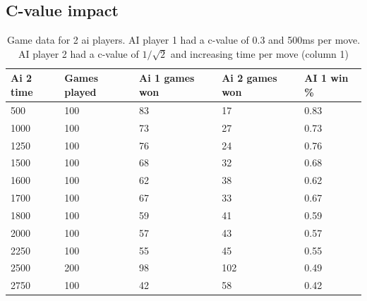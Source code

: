 \documentclass[
11pt, %
english, %
singlespacing, %
headsepline, %
]{MastersDoctoralThesis} %
\begin{document}
\begin{appendices}
\subsection{C-value impact}
\begin{table}[H]
	\centering
\begin{tabular}{|l||l|l|l|l|}
	\hline
	Ai 2 time & Games played & Ai 1 games won & Ai 2 games won & AI 1 win \% \\ \hline \hline
	500       & 100          & 83             & 17             & 0.83        \\ \hline
	1000      & 100          & 73             & 27             & 0.73        \\ \hline
	1250      & 100          & 76             & 24             & 0.76        \\ \hline
	1500      & 100          & 68             & 32             & 0.68        \\ \hline
	1600      & 100          & 62             & 38             & 0.62        \\ \hline
	1700      & 100          & 67             & 33             & 0.67        \\ \hline
	1800      & 100          & 59             & 41             & 0.59        \\ \hline
	2000      & 100          & 57             & 43             & 0.57        \\ \hline
	2250      & 100          & 55             & 45             & 0.55        \\ \hline
	2500      & 200          & 98             & 102            & 0.49        \\ \hline
	2750      & 100          & 42             & 58             & 0.42        \\ \hline

\end{tabular}
	\caption{Game data for 2 ai players. AI player 1 had a c-value of 0.3 and 500ms per move. AI player 2 had a c-value of $1/\sqrt{2}$ and increasing time per move (column 1)}
	\label{table:fourinarow-significance}
\end{table}


\end{appendices}
\end{document}
